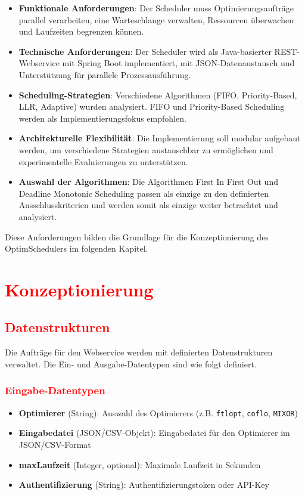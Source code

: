\documentclass[
    12pt,               
    a4paper,            
    ngerman,            
    parskip=half,       
    headings=normal,   
    numbers=enddot,     
    toc=chapterentrywithdots 
]{scrreprt}\usepackage[utf8]{inputenc}
\begin{document}
\begin{itemize}
    \item \textbf{Funktionale Anforderungen}: Der Scheduler muss Optimierungsaufträge parallel verarbeiten, eine Warteschlange verwalten, Ressourcen überwachen und Laufzeiten begrenzen können.
    
    \item \textbf{Technische Anforderungen}: Der Scheduler wird als Java-basierter REST-Webservice mit Spring Boot implementiert, mit JSON-Datenaustausch und Unterstützung für parallele Prozessausführung.
    
    \item \textbf{Scheduling-Strategien}: Verschiedene Algorithmen (FIFO, Priority-Based, LLR, Adaptive) wurden analysiert. FIFO und Priority-Based Scheduling werden als Implementierungsfokus empfohlen.
    
    \item \textbf{Architekturelle Flexibilität}: Die Implementierung soll modular aufgebaut werden, um verschiedene Strategien austauschbar zu ermöglichen und experimentelle Evaluierungen zu unterstützen.

    \item \textbf{Auswahl der Algorithmen}: Die Algorithmen First In First Out und Deadline Monotonic Scheduling passen als einzige zu den definierten Ausschlusskriterien und werden somit als einzige weiter betrachtet und analysiert.
\end{itemize}

Diese Anforderungen bilden die Grundlage für die Konzeptionierung des OptimSchedulers im folgenden Kapitel.

\chapter{\textcolor{red}{Konzeptionierung}}
\section{\textcolor{red}{Datenstrukturen}}
Die Aufträge für den Webservice werden mit definierten Datenstrukturen verwaltet. Die Ein- und Ausgabe-Datentypen sind wie folgt definiert.

\subsection{\textcolor{red}{Eingabe-Datentypen}}
\begin{itemize}
    \item \textbf{Optimierer} (String): Auswahl des Optimierers (z.B. \texttt{ftlopt}, \texttt{coflo}, \texttt{MIXOR})
    \item \textbf{Eingabedatei} (JSON/CSV-Objekt): Eingabedatei für den Optimierer im JSON/CSV-Format
    \item \textbf{maxLaufzeit} (Integer, optional): Maximale Laufzeit in Sekunden
    \item \textbf{Authentifizierung} (String): Authentifizierungstoken oder API-Key
\end{itemize}
\end{document}
